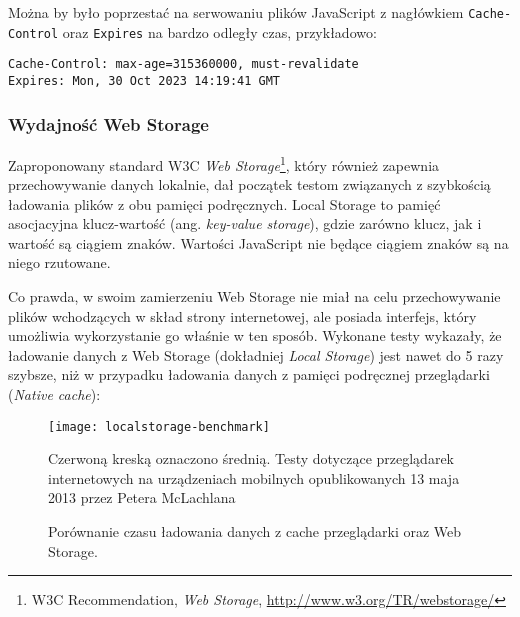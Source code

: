Można by było poprzestać na serwowaniu plików JavaScript z nagłówkiem \lstinline{Cache-Control} oraz \lstinline{Expires} na bardzo odległy czas, przykładowo:

\lstset{language=Octave}
\begin{lstlisting}
Cache-Control: max-age=315360000, must-revalidate
Expires: Mon, 30 Oct 2023 14:19:41 GMT
\end{lstlisting}

\subsubsection{Wydajność Web Storage}
\label{subsub:webstorage-performance}

Zaproponowany standard W3C \emph{Web Storage}\cite{webstorage}\footnote{W3C Recommendation, {\em Web Storage}, \url{http://www.w3.org/TR/webstorage/}}, który również zapewnia przechowywanie danych lokalnie, dał początek testom związanych z szybkością ładowania plików z obu pamięci podręcznych. Local Storage to pamięć asocjacyjna klucz-wartość (ang. \emph{key-value storage}), gdzie zarówno klucz, jak i wartość są ciągiem znaków. Wartości JavaScript nie będące ciągiem znaków są na niego rzutowane.

Co prawda, w swoim zamierzeniu Web Storage nie miał na celu przechowywanie plików wchodzących w skład strony internetowej, ale posiada interfejs, który umożliwia wykorzystanie go właśnie w ten sposób. Wykonane testy wykazały, że ładowanie danych z Web Storage (dokładniej \emph{Local Storage}) jest nawet do 5 razy szybsze, niż w przypadku ładowania danych z pamięci podręcznej przeglądarki (\emph{Native cache})\cite{http-cache-mobile-benchmark}:

\begin{figure}[h!]
  \centering
    \texttt{[image: localstorage-benchmark]}
  \caption[Porównanie czasu ładowania danych z cache przeglądarki oraz Web Storage]{Porównanie czasu ładowania danych z cache przeglądarki oraz Web Storage.}
  Czerwoną kreską oznaczono średnią. Testy dotyczące przeglądarek internetowych na urządzeniach mobilnych opublikowanych 13 maja 2013 przez Petera McLachlana\cite{http-cache-mobile-benchmark}
\end{figure}


